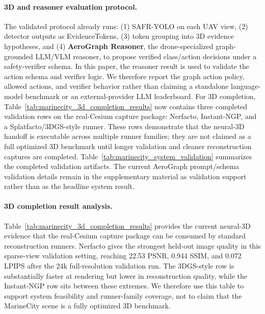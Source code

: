 \paragraph{3D and reasoner evaluation protocol.}
The validated protocol already runs: (1) SAFR-YOLO on each UAV view, (2)
detector outputs as EvidenceTokens, (3) token grouping into 3D evidence
hypotheses, and (4) \textbf{AeroGraph Reasoner}, the drone-specialized
graph-grounded LLM/VLM reasoner, to propose verified class/action decisions
under a safety-verifier schema. In this paper, the reasoner result is used to
validate the action schema and verifier logic. We therefore report the graph
action policy, allowed actions, and verifier behavior rather than claiming a
standalone language-model benchmark or an external-provider LLM leaderboard. For 3D
completion, Table~\ref{tab:marinecity_3d_completion_results} now contains three
completed validation rows on the real-Cesium capture package: Nerfacto,
Instant-NGP, and a Splatfacto/3DGS-style runner. These rows demonstrate that the
neural-3D handoff is executable across multiple runner families; they are not
claimed as a full optimized 3D benchmark until longer validation and cleaner
reconstruction captures are completed.
Table~\ref{tab:marinecity_system_validation} summarizes the completed validation
artifacts. The current AeroGraph prompt/schema validation details
remain in the supplementary material as validation support rather than as the
headline system result.

\begin{table}[t]
\centering
\scriptsize
\setlength{\tabcolsep}{3pt}
\caption{MarineCity neural 3D completion validation metrics on held-out real-Cesium
MarineCity views. Only completed runner rows are included; these rows verify
runner-family execution rather than claim a final optimized benchmark.}
\label{tab:marinecity_3d_completion_results}

\end{table}

\paragraph{3D completion result analysis.}
Table~\ref{tab:marinecity_3d_completion_results} provides the current
neural-3D evidence that the real-Cesium capture package can be consumed by
standard reconstruction runners. Nerfacto gives the strongest held-out image
quality in this sparse-view validation setting, reaching 22.53 PSNR, 0.944 SSIM, and
0.072 LPIPS after the 24k full-resolution validation run. The 3DGS-style row is
substantially faster at rendering but lower in reconstruction quality, while the
Instant-NGP row sits between these extremes. We therefore use this table to
support system feasibility and runner-family coverage, not to claim that the
MarineCity scene is a fully optimized 3D benchmark.

